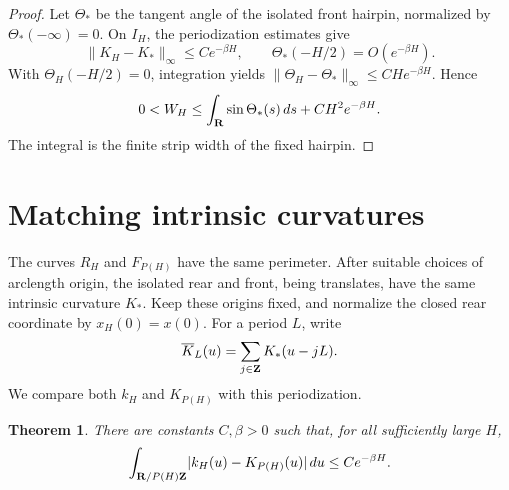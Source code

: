 \documentclass[11pt]{article}
\numberwithin{equation}{section}
\newtheorem{theorem}{Theorem}[section]
\newcommand{\R}{{\bf R}}
\newcommand{\Z}{{\bf Z}}
\newcommand{\abs}[1]{\lvert #1\rvert}
\newcommand{\norm}[1]{\lVert #1\rVert}
\begin{document}
\begin{proof}
Let \(\Theta_*\) be the tangent angle of the isolated front hairpin,
normalized by \(\Theta_*(-\infty)=0\). On \(I_H\), the periodization
estimates give
\[
  \norm{K_H-K_*}_\infty\leq Ce^{-\beta H},\qquad
  \Theta_*(-H/2)=O(e^{-\beta H}).
\]
With \(\Theta_H(-H/2)=0\), integration yields
\(\norm{\Theta_H-\Theta_*}_\infty\leq CHe^{-\beta H}\). Hence
\[
  0<W_H\leq\int_\R\sin\Theta_*(s)\,ds+CH^2e^{-\beta H}.
\]
The integral is the finite strip width of the fixed hairpin.
\end{proof}

\section{Matching intrinsic curvatures}\label{sec:matching}

The curves \(R_H\) and \(F_{P(H)}\) have the same perimeter. After suitable
choices of arclength origin, the isolated rear and front, being translates,
have the same intrinsic curvature \(K_*\). Keep these origins fixed, and
normalize the closed rear coordinate by \(x_H(0)=x(0)\). For a period \(L\), write
\[
  \overline K_L(u)=\sum_{j\in\Z}K_*(u-jL).
\]
We compare both \(k_H\) and \(K_{P(H)}\) with this periodization.

\begin{theorem}\label{thm:matching}
There are constants \(C,\beta>0\) such that, for all sufficiently large
\(H\),
\begin{equation}\label{eq:matching}
  \int_{\R/P(H)\Z}\abs{k_H(u)-K_{P(H)}(u)}\,du
  \leq Ce^{-\beta H}.
\end{equation}
\end{theorem}
\end{document}
